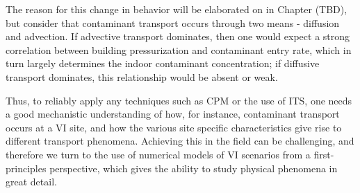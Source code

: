 The reason for this change in behavior will be elaborated on in Chapter (TBD), but consider that contaminant transport occurs through two means - diffusion and advection. %
If advective transport dominates, then one would expect a strong correlation between building pressurization and contaminant entry rate, which in turn largely determines the indoor contaminant concentration; if diffusive transport dominates, this relationship would be absent or weak.\par

Thus, to reliably apply any techniques such as CPM or the use of ITS, one needs a good mechanistic understanding of how, for instance, contaminant transport occurs at a VI site, and how the various site specific characteristics give rise to different transport phenomena.
Achieving this in the field can be challenging, and therefore we turn to the use of numerical models of VI scenarios from a first-principles perspective, which gives the ability to study physical phenomena in great detail.\par
